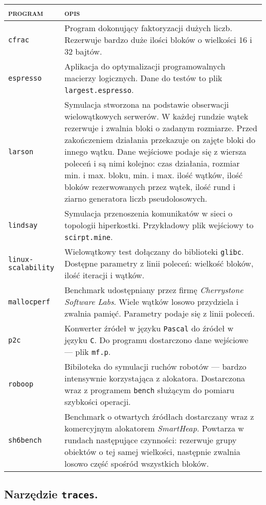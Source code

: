 \documentclass[12pt,a4paper,titlepage,twoside]{mwart}
\begin{document}
\begin{tabularx}{\textwidth}{|l|X|}
\hline
\textsc{program} & \textsc{opis} \\
\hline
\hline
\verb+cfrac+ & Program dokonujący faktoryzacji dużych liczb. Rezerwuje bardzo
duże ilości bloków o wielkości 16 i 32 bajtów. \\
\hline
\verb+espresso+ & Aplikacja do optymalizacji programowalnych macierzy
logicznych. Dane do testów to plik \texttt{largest.espresso}. \\
\hline
\verb+larson+ & Symulacja stworzona na podstawie obserwacji wielowątkowych
serwerów. W każdej rundzie wątek rezerwuje i zwalnia bloki o zadanym rozmiarze.
Przed zakończeniem działania przekazuje on zajęte bloki do innego wątku. Dane
wejściowe podaje się z wiersza poleceń i są nimi kolejno: czas działania, rozmiar
min. i max. bloku, min. i max.  ilość wątków, ilość bloków rezerwowanych przez
wątek, ilość rund i ziarno generatora liczb pseudolosowych. \\
\hline
\verb+lindsay+ & Symulacja przenoszenia komunikatów w sieci o topologii
hiperkostki. Przykładowy plik wejściowy to \texttt{scirpt.mine}. \\
\hline
\verb+linux-scalability+ & Wielowątkowy test dołączany do biblioteki
\texttt{glibc}. Dostępne parametry z linii poleceń: wielkość bloków, ilość
iteracji i wątków.\\
\hline
\verb+mallocperf+ & Benchmark udostępniany przez firmę \textit{Cherrystone
Software Labs}. Wiele wątków losowo przydziela i zwalnia pamięć. Parametry
podaje się z linii poleceń.\\
\hline
\verb+p2c+ & Konwerter źródeł w języku \texttt{Pascal} do źródeł w języku
\texttt{C}. Do programu dostarczono dane wejściowe --- plik \texttt{mf.p}. \\
\hline
\verb+roboop+ & Bibiloteka do symulacji ruchów robotów --- bardzo intensywnie
korzystająca z alokatora. Dostarczona wraz z programem \texttt{bench} służącym
do pomiaru szybkości operacji. \\
\hline
\verb+sh6bench+ & Benchmark o otwartych źródłach dostarczany wraz z komercyjnym
alokatorem \textit{SmartHeap}. Powtarza w rundach następujące czynności:
rezerwuje grupy obiektów o tej samej wielkości, następnie zwalnia losowo część
spośród wszystkich bloków. \\
\hline
\end{tabularx}

\subsection{Narzędzie \texttt{traces}.}
\end{document}
